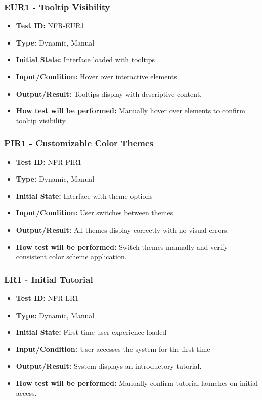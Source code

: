 \documentclass[12pt, titlepage]{article}
\begin{document}
\subsubsection{EUR1 - Tooltip Visibility}
\begin{itemize}
    \item \textbf{Test ID:} NFR-EUR1
    \item \textbf{Type:} Dynamic, Manual
    \item \textbf{Initial State:} Interface loaded with tooltips
    \item \textbf{Input/Condition:} Hover over interactive elements
    \item \textbf{Output/Result:} Tooltips display with descriptive content.
    \item \textbf{How test will be performed:} Manually hover over elements to confirm tooltip visibility.
\end{itemize}

\subsubsection{PIR1 - Customizable Color Themes}
\begin{itemize}
    \item \textbf{Test ID:} NFR-PIR1
    \item \textbf{Type:} Dynamic, Manual
    \item \textbf{Initial State:} Interface with theme options
    \item \textbf{Input/Condition:} User switches between themes
    \item \textbf{Output/Result:} All themes display correctly with no visual errors.
    \item \textbf{How test will be performed:} Switch themes manually and verify consistent color scheme application.
\end{itemize}

\subsubsection{LR1 - Initial Tutorial}
\begin{itemize}
    \item \textbf{Test ID:} NFR-LR1
    \item \textbf{Type:} Dynamic, Manual
    \item \textbf{Initial State:} First-time user experience loaded
    \item \textbf{Input/Condition:} User accesses the system for the first time
    \item \textbf{Output/Result:} System displays an introductory tutorial.
    \item \textbf{How test will be performed:} Manually confirm tutorial launches on initial access.
\end{itemize}
\end{document}
